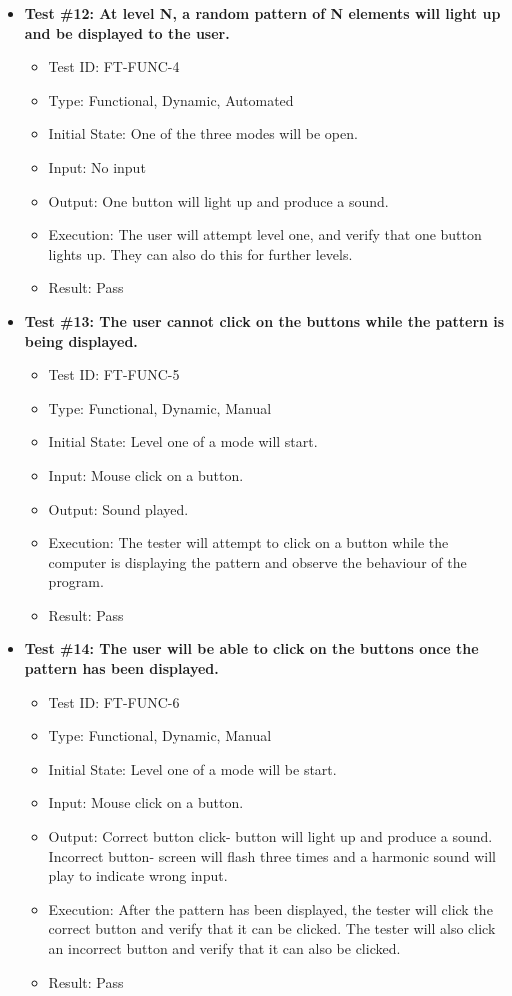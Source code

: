 \documentclass[12pt, titlepage]{article}
\begin{document}
\begin{itemize}
\item \textbf{Test \#12: At level N, a random pattern of N elements will light up and be displayed to the user. }
\begin{itemize}
\item Test ID: FT-FUNC-4
\item Type: Functional, Dynamic, Automated		
\item Initial State: One of the three modes will be open. 					
\item Input: No input				
\item Output: One button will light up and produce a sound.		
\item Execution: The user will attempt level one, and verify that one button lights up. They can also do this for further levels. 
\item Result: Pass
\end{itemize}

\item \textbf{Test \#13: The user cannot click on the buttons while the pattern is being displayed.}
\begin{itemize}
\item Test ID: FT-FUNC-5
\item Type: Functional, Dynamic, Manual	
\item Initial State: Level one of a mode will start.					
\item Input: Mouse click on a button. 					
\item Output: Sound played. 					
\item Execution: The tester will attempt to click on a button while the computer is displaying the pattern and observe the behaviour of the program.
\item Result: Pass
\end{itemize}

\item \textbf{Test \#14: The user will be able to click on the buttons once the pattern has been displayed.}
\begin{itemize}
\item Test ID: FT-FUNC-6
\item Type: Functional, Dynamic, Manual	
\item Initial State: Level one of a mode will be start.					
\item Input: Mouse click on a button.					
\item Output: Correct button click- button will light up and produce a sound. Incorrect button- screen will flash three times and a harmonic sound will play to indicate wrong input. 					
\item Execution: After the pattern has been displayed, the tester will click the correct button and verify that it can be clicked. The tester will also click an incorrect button and verify that it can also be clicked.
\item Result: Pass
\end{itemize}


\end{itemize}
\end{document}
